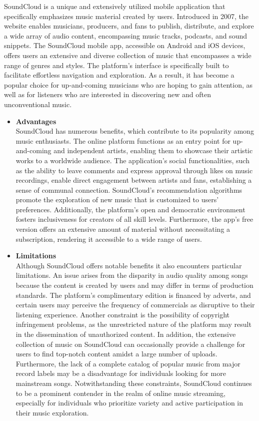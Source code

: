 SoundCloud is a unique and extensively utilized mobile application that specifically emphasizes music material created by users. Introduced in 2007, the website enables musicians, producers, and fans to publish, distribute, and explore a wide array of audio content, encompassing music tracks, podcasts, and sound snippets. The SoundCloud mobile app, accessible on Android and iOS devices, offers users an extensive and diverse collection of music that encompasses a wide range of genres and styles. The platform's interface is specifically built to facilitate effortless navigation and exploration. As a result, it has become a popular choice for up-and-coming musicians who are hoping to gain attention, as well as for listeners who are interested in discovering new and often unconventional music. \pagebreak
\begin{itemize}[\label{}]
    \item \textbf{Advantages} \\
    SoundCloud has numerous benefits, which contribute to its popularity among music enthusiasts. The online platform functions as an entry point for up-and-coming and independent artists, enabling them to showcase their artistic works to a worldwide audience. The application's social functionalities, such as the ability to leave comments and express approval through likes on music recordings, enable direct engagement between artists and fans, establishing a sense of communal connection. SoundCloud's recommendation algorithms promote the exploration of new music that is customized to users' preferences. Additionally, the platform's open and democratic environment fosters inclusiveness for creators of all skill levels. Furthermore, the app's free version offers an extensive amount of material without necessitating a subscription, rendering it accessible to a wide range of users.
    \item \textbf{Limitations} \\
    Although SoundCloud offers notable benefits it also encounters particular limitations. An issue arises from the disparity in audio quality among songs because the content is created by users and may differ in terms of production standards. The platform's complimentary edition is financed by adverts, and certain users may perceive the frequency of commercials as disruptive to their listening experience. Another constraint is the possibility of copyright infringement problems, as the unrestricted nature of the platform may result in the dissemination of unauthorized content. In addition, the extensive collection of music on SoundCloud can occasionally provide a challenge for users to find top-notch content amidst a large number of uploads. Furthermore, the lack of a complete catalog of popular music from major record labels may be a disadvantage for individuals looking for more mainstream songs. Notwithstanding these constraints, SoundCloud continues to be a prominent contender in the realm of online music streaming, especially for individuals who prioritize variety and active participation in their music exploration.
\end{itemize}
\pagebreak

